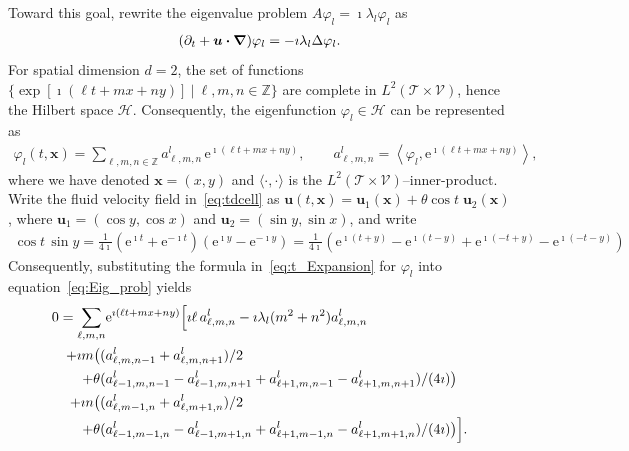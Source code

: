 \documentclass[leqno,onefignum,onetabnum]{siamltex1213}
\newcommand{\e}{\mathrm{e}}
\newcommand{\Tc}{\mathcal{T}}
\newcommand{\Vc}{\mathcal{V}}
\newcommand{\Hs}{\mathscr{H}}
\newcommand\bnabla{\mbox{\boldmath${\nabla}$}}
\providecommand\bcdot{\boldsymbol{\cdot}}
\newcommand{\vecx}{\boldsymbol{x}}
\newcommand{\vecu}{\boldsymbol{u}}
\begin{document}
Toward this goal, rewrite the eigenvalue problem $A\varphi_l=\imath\lambda_l\varphi_l$ as         
%
\begin{align}\label{eq:Eig_prob}
  (\partial_t+\vecu \bcdot\bnabla )\varphi_l=-\imath\lambda_l\Delta\varphi_l.
\end{align}
%
For spatial dimension $d=2$, the set of functions
$\{\exp[\imath(\ell t+mx+ny)] \ |\  \ell,m,n\in\mathbb{Z}\}$ are 
complete in $L^2(\Tc\times\Vc)$, hence the Hilbert space $\Hs$. Consequently,
the eigenfunction $\varphi_l\in\Hs$ can be represented as
%
\begin{align}\label{eq:t_Expansion}
  \varphi_l(t,\vecx)=\sum_{\ell,m,n\in\mathbb{Z}} a^l_{\ell,m,n}\,\e^{\imath(\ell t+mx+ny)},
  \qquad
  a^l_{\ell,m,n}=\left\langle\varphi_l,\e^{\imath(\ell t+mx+ny)}\right\rangle,
\end{align}
%
where we have denoted $\vecx=(x,y)$ and $\langle\cdot,\cdot\rangle$ is the
$L^2(\Tc\times\Vc)$--inner-product. Write the fluid velocity field
in~\eqref{eq:tdcell} as  
$\vecu(t,\vecx)=\vecu_1(\vecx)+\theta\cos{t}\;\vecu_2(\vecx)$, where
$\vecu_1=(\cos{y},\cos{x})$ and $\vecu_2=(\sin{y},\sin{x})$, and write
%
\begin{align}
  \cos{t}\,\sin{y}=\frac{1}{4\imath}(\e^{\imath t}+\e^{-\imath t})(\e^{\imath y}-\e^{-\imath y})
                =\frac{1}{4\imath}(\e^{\imath (t+y)}-\e^{\imath (t-y)}+\e^{\imath
                  (-t+y)}-\e^{\imath (-t-y)})
\end{align}
%
Consequently, substituting the formula in~\eqref{eq:t_Expansion} for $\varphi_l$
 into equation~\eqref{eq:Eig_prob} yields
%
\begin{align}\label{eq:Fourier_Cell_Problem}
 0=\sum_{\ell,m,n} &\e^{\imath(\ell t+mx+ny)}\Big[
     \imath\ell\,a^l_{\ell,m,n}-\imath\lambda_l(m^2+n^2)a^l_{\ell,m,n}
     \\\notag
     +\imath m\big((&a^l_{\ell,m,n-1}+a^l_{\ell,m,n+1})/2
     \\\notag
        +\theta (&a^l_{\ell-1,m,n-1}-a^l_{\ell-1,m,n+1}+a^l_{\ell+1,m,n-1}-a^l_{\ell+1,m,n+1})/(4\imath)
        \big)
        \\\notag
     +\imath n\big((&a^l_{\ell,m-1,n}+a^l_{\ell,m+1,n})/2
        \\\notag
        +\theta(&a^l_{\ell-1,m-1,n}-a^l_{\ell-1,m+1,n}+a^l_{\ell+1,m-1,n}-a^l_{\ell+1,m+1,n})/(4\imath)  
         \big)
 \Big].
 \notag
\end{align}
\end{document}
